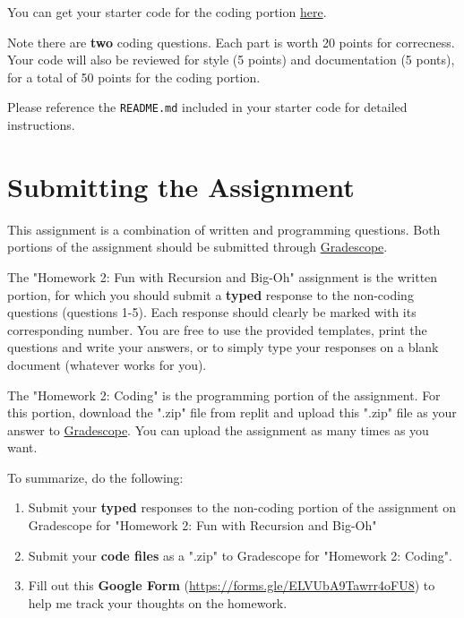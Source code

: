 \documentclass [12pt]{article}
\begin{document}
You can get your starter code for the coding portion \href{https://replit.com/team/COMP285/HW2-Code}{here}.

Note there are \textbf{two} coding questions. Each part is worth 20 points for correcness. Your code will also be reviewed for style (5 points) and documentation (5 ponts), for a total of 50 points for the coding portion.

Please reference the \texttt{README.md} included in your starter code for detailed instructions.

\section*{Submitting the Assignment}

This assignment is a combination of written and programming questions. Both portions of the assignment should be submitted through \href{https://www.gradescope.com/courses/350304}{Gradescope}.

The "Homework 2: Fun with Recursion and Big-Oh" assignment is the written portion, for which you should submit a \textbf{typed} response to the non-coding questions (questions 1-5). Each response should clearly be marked with its corresponding number. You are free to use the provided templates, print the questions and write your answers, or to simply type your responses on a blank document (whatever works for you).

The "Homework 2: Coding" is the programming portion of the assignment. For this portion, download the ".zip" file from replit and upload this ".zip" file as your answer to \href{https://www.gradescope.com/courses/350304}{Gradescope}. You can upload the assignment as many times as you want.


To summarize, do the following:
\begin{enumerate}
    \item Submit your \textbf{typed} responses to the non-coding portion of the assignment on Gradescope for "Homework 2: Fun with Recursion and Big-Oh"
    \item Submit your \textbf{code files} as a ".zip" to Gradescope for "Homework 2: Coding".
    \item Fill out this \textbf{Google Form} (\href{https://forms.gle/ELVUbA9Tawrr4oFU8}{https://forms.gle/ELVUbA9Tawrr4oFU8}) to help me track your thoughts on the homework.
\end{enumerate}
\end{document}
